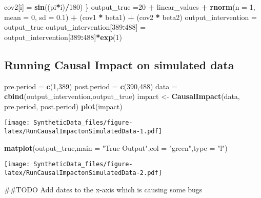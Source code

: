 \documentclass[
]{article}
\newenvironment{Shaded}{\begin{snugshade}}{\end{snugshade}}
\newcommand{\DataTypeTok}[1]{\textcolor[rgb]{0.13,0.29,0.53}{#1}}
\newcommand{\DecValTok}[1]{\textcolor[rgb]{0.00,0.00,0.81}{#1}}
\newcommand{\FloatTok}[1]{\textcolor[rgb]{0.00,0.00,0.81}{#1}}
\newcommand{\KeywordTok}[1]{\textcolor[rgb]{0.13,0.29,0.53}{\textbf{#1}}}
\newcommand{\NormalTok}[1]{#1}
\newcommand{\OperatorTok}[1]{\textcolor[rgb]{0.81,0.36,0.00}{\textbf{#1}}}
\newcommand{\StringTok}[1]{\textcolor[rgb]{0.31,0.60,0.02}{#1}}
\begin{document}
\begin{Shaded}
\begin{Highlighting}[]
\NormalTok{  cov2[i] =}\StringTok{ }\KeywordTok{sin}\NormalTok{((pi}\OperatorTok{*}\NormalTok{i)}\OperatorTok{/}\DecValTok{180}\NormalTok{)}
\NormalTok{\}}
\NormalTok{output_true =}\DecValTok{20} \OperatorTok{+}\StringTok{ }\NormalTok{linear_values }\OperatorTok{+}\StringTok{ }\KeywordTok{rnorm}\NormalTok{(}\DataTypeTok{n =} \DecValTok{1}\NormalTok{, }\DataTypeTok{mean =} \DecValTok{0}\NormalTok{, }\DataTypeTok{sd =} \FloatTok{0.1}\NormalTok{) }\OperatorTok{+}\StringTok{ }\NormalTok{(cov1 }\OperatorTok{*}\StringTok{ }\NormalTok{beta1) }\OperatorTok{+}\StringTok{ }\NormalTok{(cov2 }\OperatorTok{*}\StringTok{ }\NormalTok{beta2)}
\NormalTok{output_intervention =}\StringTok{ }\NormalTok{output_true }
\NormalTok{output_intervention[}\DecValTok{389}\OperatorTok{:}\DecValTok{488}\NormalTok{] =}\StringTok{ }\NormalTok{output_intervention[}\DecValTok{389}\OperatorTok{:}\DecValTok{488}\NormalTok{]}\OperatorTok{*}\KeywordTok{exp}\NormalTok{(}\DecValTok{1}\NormalTok{)}
\end{Highlighting}
\end{Shaded}

\hypertarget{running-causal-impact-on-simulated-data}{%
\subsection{Running Causal Impact on simulated
data}\label{running-causal-impact-on-simulated-data}}

\begin{Shaded}
\begin{Highlighting}[]
\NormalTok{pre.period =}\StringTok{ }\KeywordTok{c}\NormalTok{(}\DecValTok{1}\NormalTok{,}\DecValTok{389}\NormalTok{)}
\NormalTok{post.period =}\StringTok{ }\KeywordTok{c}\NormalTok{(}\DecValTok{390}\NormalTok{,}\DecValTok{488}\NormalTok{)}
\NormalTok{data =}\StringTok{ }\KeywordTok{cbind}\NormalTok{(output_intervention,output_true)}
\NormalTok{impact <-}\StringTok{ }\KeywordTok{CausalImpact}\NormalTok{(data, pre.period, post.period)}
\KeywordTok{plot}\NormalTok{(impact)}
\end{Highlighting}
\end{Shaded}

\texttt{[image: SyntheticData\_files/figure-latex/RunCausalImpactonSimulatedData-1.pdf]}

\begin{Shaded}
\begin{Highlighting}[]
\KeywordTok{matplot}\NormalTok{(output_true,}\DataTypeTok{main =} \StringTok{"True Output"}\NormalTok{,}\DataTypeTok{col =} \StringTok{"green"}\NormalTok{,}\DataTypeTok{type =} \StringTok{"l"}\NormalTok{)}
\end{Highlighting}
\end{Shaded}

\texttt{[image: SyntheticData\_files/figure-latex/RunCausalImpactonSimulatedData-2.pdf]}

\#\#TODO Add dates to the x-axis which is causing some bugs
\end{document}

